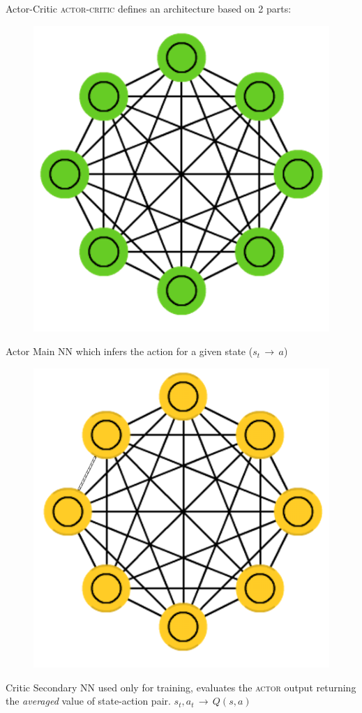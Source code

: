 \documentclass[10pt]{beamer}
\begin{document}
\begin{frame}{Actor-Critic}
	\textsc{actor-critic} defines an architecture based on 2 parts:
	\begin{figure}
		\includegraphics[scale=0.2]{img/agreen.png}
	\end{figure}
	\begin{alertblock}{Actor}
	Main \textsc{NN} which infers the action for a given state ($s_t\,\rightarrow\, a$)
	\end{alertblock}
	\vfill
	\begin{figure}
		\includegraphics[scale=0.2]{img/ayellow.png}
	\end{figure}
	\begin{alertblock}{Critic}
	Secondary \textsc{NN} used only for training, evaluates the \textsc{actor} output returning the \textit{averaged} value of state-action pair. $s_t, a_t\,\rightarrow\, Q(s, a)$
	\end{alertblock}
\end{frame}
\end{document}
